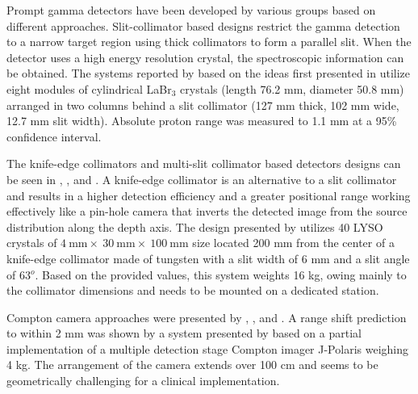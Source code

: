 \documentclass[11pt,a4paper]{article}
\begin{document}
 

Prompt gamma detectors have been developed by various groups based on different approaches. 
Slit-collimator based designs restrict the gamma detection to a narrow target region using thick collimators to form a parallel slit. When the detector uses a high energy resolution crystal, the spectroscopic information can be obtained. The systems reported by \cite{Verburg2018} based on the ideas first presented in \cite{Verburg2014} utilize eight modules of cylindrical LaBr$_3$ crystals (length 76.2 mm, diameter 50.8 mm) arranged in two columns behind a slit collimator (127 mm thick, 102 mm wide, 12.7 mm slit width). Absolute proton range was measured to 1.1 mm at a 95\% confidence interval.    

The knife-edge collimators and multi-slit collimator based detectors designs can be seen in  \cite{Perali2014}, \cite{Smeets2016}, \cite{Lin2017} and \cite{Park2019}. A knife-edge collimator is an alternative to a  slit collimator and results in a higher detection efficiency and a greater positional range working effectively like a pin-hole camera that inverts the detected image from the source distribution along the depth axis.  The design presented by \cite{Perali2014} utilizes 40 LYSO crystals of $\mathrm{4\ mm \times \ 30\ mm\times \ 100 \ mm }$ size located 200 mm from the center of a knife-edge collimator made of tungsten with a slit width of 6 mm and a slit angle of  63$^o$. Based on the provided values, this system weights 16 kg, owing mainly to the collimator dimensions and needs to be mounted on a  dedicated station.

Compton camera approaches were presented by \cite{Krimmer2015}, \cite{Solevi2016}, \cite{Draeger2018} and \cite{Yao2019}. A range shift prediction to within 2 mm was shown by a system presented by \cite{Draeger2018} based on a partial implementation of a multiple detection stage Compton imager J-Polaris weighing 4 kg.  The arrangement of the camera extends over 100 cm and seems to be geometrically challenging for a clinical implementation. 
\end{document}
